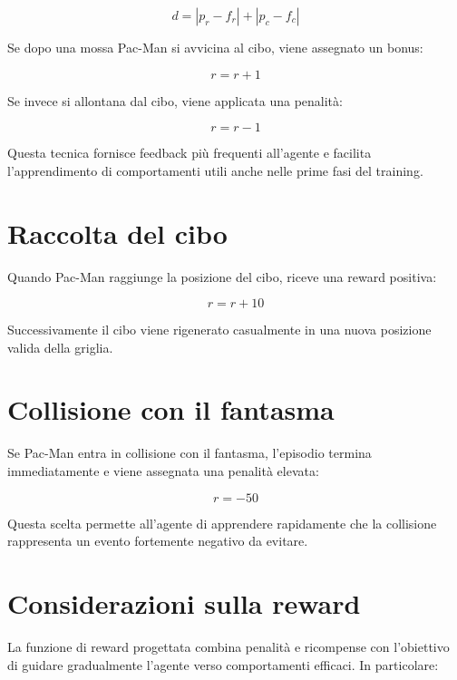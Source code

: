 \documentclass[12pt,a4paper]{report}
\begin{document}
\begin{equation}
d = |p_r - f_r| + |p_c - f_c|
\end{equation}

Se dopo una mossa Pac-Man si avvicina al cibo, viene assegnato un bonus:

\begin{equation}
r = r + 1
\end{equation}

Se invece si allontana dal cibo, viene applicata una penalità:

\begin{equation}
r = r - 1
\end{equation}

Questa tecnica fornisce feedback più frequenti all’agente e facilita l’apprendimento di comportamenti utili anche nelle prime fasi del training.

\section{Raccolta del cibo}

Quando Pac-Man raggiunge la posizione del cibo, riceve una reward positiva:

\begin{equation}
r = r + 10
\end{equation}

Successivamente il cibo viene rigenerato casualmente in una nuova posizione valida della griglia.

\section{Collisione con il fantasma}

Se Pac-Man entra in collisione con il fantasma, l’episodio termina immediatamente e viene assegnata una penalità elevata:

\begin{equation}
r = -50
\end{equation}

Questa scelta permette all’agente di apprendere rapidamente che la collisione rappresenta un evento fortemente negativo da evitare.

\section{Considerazioni sulla reward}

La funzione di reward progettata combina penalità e ricompense con l’obiettivo di guidare gradualmente l’agente verso comportamenti efficaci. In particolare:
\end{document}
